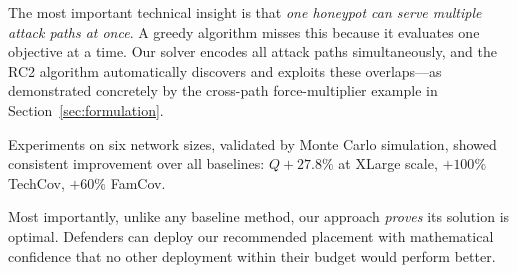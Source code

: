 \documentclass[journal]{IEEEtran}
\newcommand{\rcII}{\textsc{RC2}}
\begin{document}
The most important technical insight is that \emph{one
honeypot can serve multiple attack paths at once}.
A greedy algorithm misses this because it evaluates one
objective at a time.
Our solver encodes all attack paths simultaneously, and the
\rcII{} algorithm automatically discovers and exploits
these overlaps---as demonstrated concretely by the
cross-path force-multiplier example in
Section~\ref{sec:formulation}.

Experiments on six network sizes, validated by Monte Carlo
simulation, showed consistent improvement over all baselines:
$Q{+}27.8\%$ at XLarge scale, $+100\%$ TechCov, $+60\%$
FamCov.

Most importantly, unlike any baseline method, our approach
\emph{proves} its solution is optimal.
Defenders can deploy our recommended placement with
mathematical confidence that no other deployment within their
budget would perform better.
\end{document}
